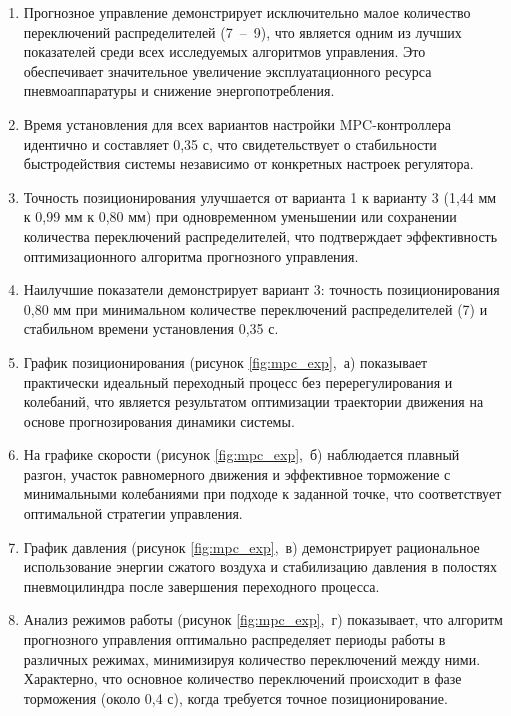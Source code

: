 \begin{enumerate}
	\item Прогнозное управление демонстрирует исключительно малое количество переключений
	      распределителей (7~--~9), что является одним из лучших показателей среди всех исследуемых алгоритмов управления.
	      Это обеспечивает значительное увеличение эксплуатационного ресурса пневмоаппаратуры и снижение энергопотребления.

	\item Время установления для всех вариантов настройки MPC-контроллера идентично и составляет
	      0,35 с, что свидетельствует о стабильности быстродействия системы независимо от конкретных настроек регулятора.

	\item Точность позиционирования улучшается от варианта 1 к варианту 3 (1,44 мм к 0,99 мм к 0,80 мм) при одновременном
	      уменьшении или сохранении количества переключений распределителей, что подтверждает эффективность оптимизационного алгоритма прогнозного управления.

	\item Наилучшие показатели демонстрирует вариант 3: точность позиционирования 0,80 мм при
	      минимальном количестве переключений распределителей (7) и стабильном времени установления 0,35 с.

	\item График позиционирования (рисунок \ref{fig:mpc_exp},~а) показывает практически идеальный переходный
	      процесс без перерегулирования и колебаний, что является результатом оптимизации траектории движения на основе прогнозирования динамики системы.

	\item На графике скорости (рисунок \ref{fig:mpc_exp},~б) наблюдается плавный разгон, участок равномерного движения и
	      эффективное торможение с минимальными колебаниями при подходе к заданной точке, что соответствует оптимальной стратегии управления.

	\item График давления (рисунок \ref{fig:mpc_exp},~в) демонстрирует рациональное использование энергии сжатого
	      воздуха и стабилизацию давления в полостях пневмоцилиндра после завершения переходного процесса.

	\item Анализ режимов работы (рисунок \ref{fig:mpc_exp},~г) показывает, что алгоритм прогнозного управления оптимально
	      распределяет периоды работы в различных режимах, минимизируя количество переключений между ними. Характерно, что
	      основное количество переключений происходит в фазе торможения (около 0,4 с), когда требуется точное позиционирование.
\end{enumerate}

